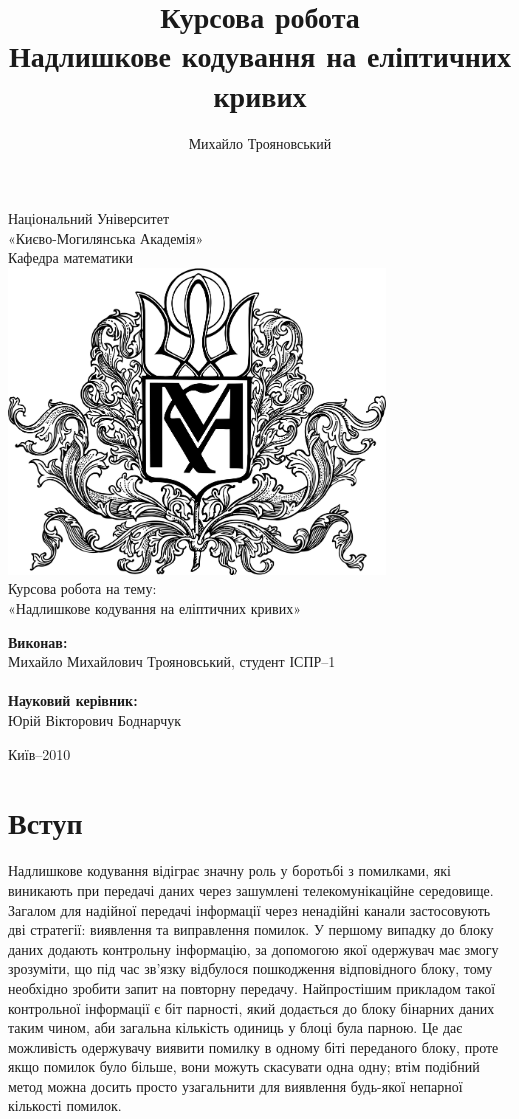 \documentclass[a4paper,12pt,oneside]{article}
\title{Курсова робота\\Надлишкове кодування на еліптичних кривих}
\author{Михайло Трояновський}
\begin{document}
\begin{titlepage}
\begin{center}
Національний Університет\\ «Києво-Могилянська Академія»\\
        Кафедра математики\\
        \vskip 3cm
        \includegraphics[width=100mm]{kma}\\
                               \vskip 1cm
{\Large
    Курсова робота на тему:\\
        «Надлишкове кодування на еліптичних кривих»
}
\vskip 1cm
\textwidth
\begin{minipage}{0.5\textwidth}
\textbf{Виконав:}\\
        Михайло Михайлович Трояновський, студент ІСПР–1\\
        \\
        \textbf{Науковий керівник:}\\
        Юрій Вікторович Боднарчук
        \end{minipage}
        \vfill
        Київ–2010
        \end{center}
        \end{titlepage}


\tableofcontents
\pagebreak

\section{Вступ}
Надлишкове кодування відіграє значну роль у боротьбі з помилками, які виникають при передачі даних через зашумлені телекомунікаційне середовище. 
Загалом для надійної передачі інформації через ненадійні канали застосовують дві стратегії: виявлення та виправлення помилок. 
У першому випадку до блоку даних додають контрольну інформацію, за допомогою якої одержувач має змогу зрозуміти, 
що під час зв'язку відбулося пошкодження відповідного блоку, тому необхідно зробити запит на повторну передачу. 
Найпростішим прикладом такої контрольної інформації є біт парності, який додається до блоку бінарних даних таким чином, аби загальна кількість одиниць у блоці була парною. 
Це дає можливість одержувачу виявити помилку в одному біті переданого блоку, проте якщо помилок було більше, вони можуть скасувати одна одну; 
втім подібний метод можна досить просто узагальнити для виявлення будь-якої непарної кількості помилок.
\end{document}
